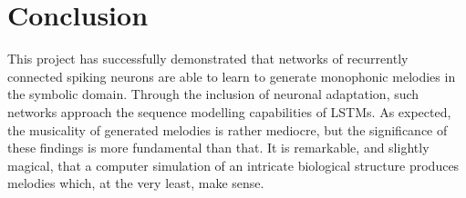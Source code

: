 \documentclass[../../report.tex]{subfiles}
\begin{document}
\chapter{Conclusion}

This project has successfully demonstrated that networks of recurrently connected
spiking neurons are able to learn to generate monophonic melodies in the
symbolic domain. Through the inclusion of neuronal adaptation, such networks
approach the sequence modelling capabilities of LSTMs. As expected, the
musicality of generated melodies is rather mediocre, but the significance of
these findings is more fundamental than that. It is remarkable, and slightly
magical, that a computer simulation of an intricate biological structure
produces melodies which, at the very least, make sense.


\end{document}
